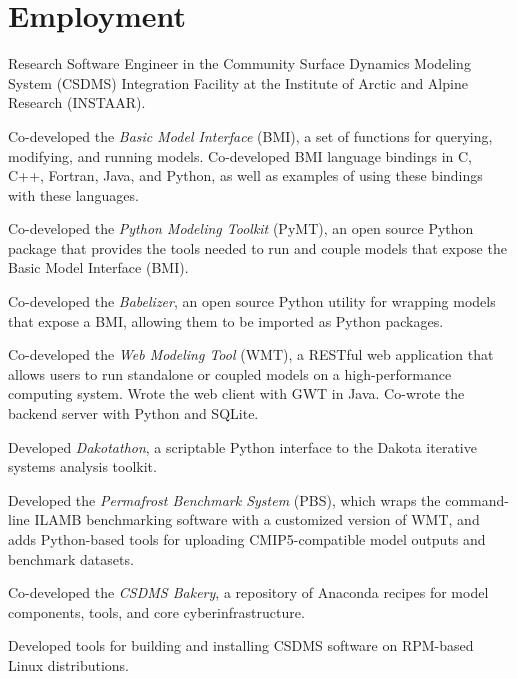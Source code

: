 \section{Employment}
\vspace{0.5em}

\begin{compactitem}[\itembullet]
  \item
    Research Software Engineer in the Community
    Surface Dynamics Modeling System (CSDMS) Integration Facility at
    the Institute of Arctic and Alpine Research (INSTAAR).
  \item
    Co-developed the \textit{Basic Model Interface} (BMI), a set of functions
    for querying, modifying, and running models. Co-developed BMI language
    bindings in C, C++, Fortran, Java, and Python, as well as examples of using
    these bindings with these languages.
  \item
    Co-developed the \textit{Python Modeling Toolkit} (PyMT), an
    open source Python package that provides the tools needed to run
    and couple models that expose the Basic Model Interface (BMI).
  \item
    Co-developed the \textit{Babelizer}, an open source Python utility for
    wrapping models that expose a BMI, allowing them to be imported as Python
    packages.
  \item
    Co-developed the \textit{Web Modeling Tool} (WMT), a RESTful
    web application that allows users to run standalone or coupled
    models on a high-performance computing system. Wrote the web
    client with GWT in Java. Co-wrote the backend server with Python
    and SQLite.
  \item
    Developed \textit{Dakotathon}, a scriptable Python interface to
    the Dakota iterative systems analysis toolkit.
  \item    
    Developed the \textit{Permafrost Benchmark System} (PBS), which
    wraps the command-line ILAMB benchmarking software with a
    customized version of WMT, and adds Python-based tools for
    uploading CMIP5-compatible model outputs and benchmark datasets.
  \item
    Co-developed the \textit{CSDMS Bakery}, a repository of Anaconda recipes
    for model components, tools, and core cyberinfrastructure.
  \item
    Developed tools for building and installing CSDMS software on
    RPM-based Linux distributions.

\end{compactitem}
